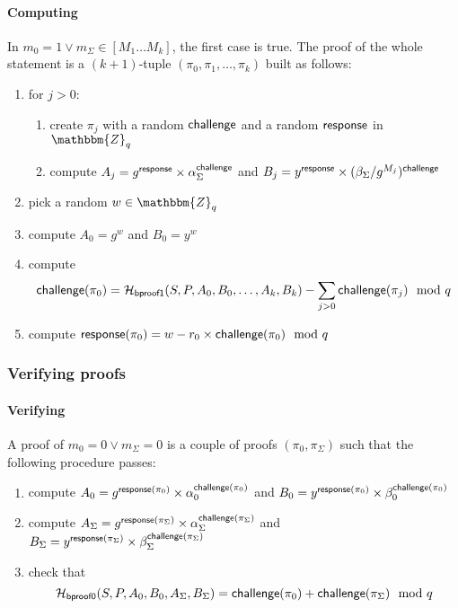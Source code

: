 \documentclass[a4paper]{article}
\newcommand{\Z}{\mathbbm{Z}}
\begin{document}
\paragraph{Computing \oproof}
In $m_0=1\lor m_\Sigma\in[M_1\dots M_k]$, the first case is
true. The proof of the whole statement is a $(k+1)$-tuple
$(\pi_0,\pi_1,\dotsc,\pi_k)$ built as follows:
\begin{enumerate}
\item for $j>0$:
  \begin{enumerate}
  \item create $\pi_j$ with a random $\textsf{challenge}$ and a random
    $\textsf{response}$ in $\Z_q$
  \item compute
    $A_j={g^{\textsf{response}}}\times{\alpha_\Sigma^{\textsf{challenge}}}$ and
    $B_j={y^{\textsf{response}}}\times{(\beta_\Sigma/g^{M_j})^{\textsf{challenge}}}$
  \end{enumerate}
\item pick a random $w\in\Z_q$
\item compute $A_0=g^w$ and $B_0=y^w$
\item compute
  \[\textsf{challenge}(\pi_0)=\mathcal{H}_{\textsf{bproof1}}(S,P,A_0,B_0,\dots,A_k,B_k)-\sum_{j>0}\textsf{challenge}(\pi_j)\mod q\]
\item compute $\textsf{response}(\pi_0)=w-r_0\times\textsf{challenge}(\pi_0)\mod q$
\end{enumerate}

\subsubsection{Verifying proofs}

\paragraph{Verifying \bproof}
A proof of $m_0=0\lor m_\Sigma=0$ is a couple of proofs
$(\pi_0,\pi_\Sigma)$ such that the following procedure passes:
\begin{enumerate}
\item compute
  $A_0=g^{\textsf{response}(\pi_0)}\times\alpha_0^{\textsf{challenge}(\pi_0)}$
  and
  $B_0=y^{\textsf{response}(\pi_0)}\times\beta_0^{\textsf{challenge}(\pi_0)}$
\item compute
  $A_\Sigma=g^{\textsf{response}(\pi_\Sigma)}\times\alpha_\Sigma^{\textsf{challenge}(\pi_\Sigma)}$
  and
  $B_\Sigma=y^{\textsf{response}(\pi_\Sigma)}\times\beta_\Sigma^{\textsf{challenge}(\pi_\Sigma)}$
\item check that
  \[\mathcal{H}_{\mathsf{bproof0}}(S,P,A_0,B_0,A_\Sigma,B_\Sigma)=\textsf{challenge}(\pi_0)+\textsf{challenge}(\pi_\Sigma)\mod q\]
\end{enumerate}
\end{document}
